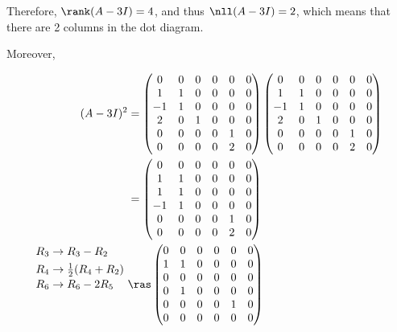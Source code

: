 \documentclass[11pt]{scrartcl}
\begin{document}
\begin{soln}
Therefore, $\rank(A-3I) = 4$, and thus $\nll (A-3I) = 2$, which means that there are 2 columns in the dot diagram.

Moreover, 

  \begin{align}
(A-3I)^2 &= 
  \begin{pmatrix}
    0  & 0 & 0 & 0 & 0 & 0 \\
    1  & 1 & 0 & 0 & 0 & 0 \\
    -1 & 1 & 0 & 0 & 0 & 0 \\
    2  & 0 & 1 & 0 & 0 & 0 \\
    0  & 0 & 0 & 0 & 1 & 0 \\
    0  & 0 & 0 & 0 & 2 & 0
  \end{pmatrix}
  \begin{pmatrix}
    0  & 0 & 0 & 0 & 0 & 0 \\
    1  & 1 & 0 & 0 & 0 & 0 \\
    -1 & 1 & 0 & 0 & 0 & 0 \\
    2  & 0 & 1 & 0 & 0 & 0 \\
    0  & 0 & 0 & 0 & 1 & 0 \\
    0  & 0 & 0 & 0 & 2 & 0
  \end{pmatrix}\\
  &= \label{eq:2}
  \begin{pmatrix}
    0  & 0 & 0 & 0 & 0 & 0 \\
    1  & 1 & 0 & 0 & 0 & 0 \\
    1 & 1 & 0 & 0 & 0 & 0 \\
    -1  & 1 & 0 & 0 & 0 & 0 \\
    0  & 0 & 0 & 0 & 1 & 0 \\
    0  & 0 & 0 & 0 & 2 & 0
  \end{pmatrix}\\
    \shortstack[l]{
$R_3\to R_3-R_2$\\
$$ \\
$R_4 \to \frac{1}{2}(R_4+R_2)$\\
$R_6 \to R_6-2R_{5}$}
\ &\ras 
  \begin{pmatrix}
    0  & 0 & 0 & 0 & 0 & 0 \\
    1  & 1 & 0 & 0 & 0 & 0 \\
    0 & 0 & 0 & 0 & 0 & 0 \\
    0  & 1 & 0 & 0 & 0 & 0 \\
    0  & 0 & 0 & 0 & 1 & 0 \\
    0  & 0 & 0 & 0 & 0 & 0
  \end{pmatrix}
  \end{align}


\end{soln}
\end{document}
